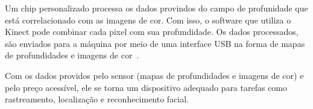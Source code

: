 Um chip personalizado processa os dados provindos do campo de profunidade que está correlacionado com as imagens de cor. Com isso, o software que utiliza o Kinect pode combinar cada pixel com sua profundidade. Os dados processados, são enviados para a máquina por meio de uma interface USB na forma de mapas de profundidades e imagens de cor~\cite{kinect}.

Com os dados providos pelo sensor (mapas de profundidades e imagens de cor) e pelo preço acessível, ele se torna um dispositivo adequado para tarefas como rastreamento, localização e reconhecimento facial.
































